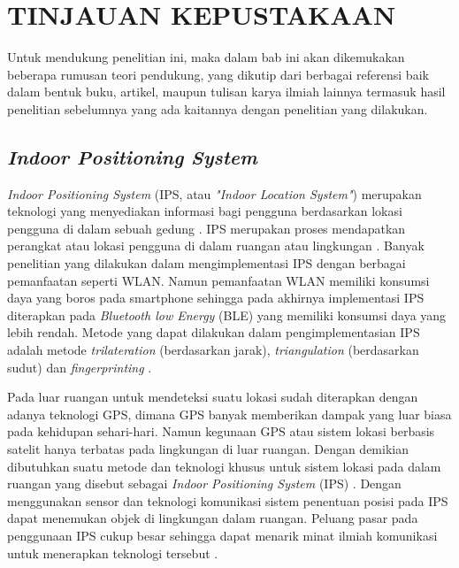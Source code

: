 \fancyhf{} 
\fancyfoot[R]{\thepage}
\chapter{TINJAUAN KEPUSTAKAAN}

\par Untuk mendukung penelitian ini, maka dalam bab ini akan dikemukakan beberapa rumusan teori pendukung, yang dikutip dari berbagai referensi baik dalam bentuk buku, artikel, maupun tulisan karya ilmiah lainnya termasuk hasil penelitian sebelumnya yang ada kaitannya dengan penelitian yang dilakukan.

\section{\textit{Indoor Positioning System}}
\textit{Indoor Positioning System} (IPS, atau \textit{"Indoor Location System"}) merupakan teknologi yang menyediakan informasi bagi pengguna berdasarkan lokasi pengguna di dalam sebuah gedung \citep{brena2017evolution}. IPS merupakan proses mendapatkan perangkat atau lokasi pengguna di dalam ruangan atau lingkungan \citep{zafari2019survey}. Banyak penelitian yang dilakukan dalam mengimplementasi IPS dengan berbagai pemanfaatan seperti WLAN. Namun pemanfaatan WLAN memiliki konsumsi daya yang boros pada smartphone sehingga pada akhirnya implementasi IPS diterapkan pada \textit{Bluetooth low Energy} (BLE) yang memiliki konsumsi daya yang lebih rendah. Metode yang dapat dilakukan dalam pengimplementasian IPS adalah metode \textit{trilateration} (berdasarkan jarak), \textit{triangulation} (berdasarkan sudut) dan \textit{fingerprinting} \citep{puspitasari2020}.

\par Pada luar ruangan untuk mendeteksi suatu lokasi sudah diterapkan dengan adanya teknologi GPS, dimana GPS banyak memberikan dampak yang luar biasa pada kehidupan sehari-hari. Namun kegunaan GPS atau sistem lokasi berbasis satelit hanya terbatas pada lingkungan di luar ruangan. Dengan demikian dibutuhkan suatu metode dan teknologi khusus untuk sistem lokasi pada dalam ruangan yang disebut sebagai \textit{Indoor Positioning System} (IPS) \citep{brena2017evolution}. Dengan menggunakan sensor dan teknologi komunikasi sistem penentuan posisi pada IPS dapat menemukan objek di lingkungan dalam ruangan. Peluang pasar pada penggunaan IPS cukup besar sehingga dapat menarik minat ilmiah komunikasi untuk menerapkan teknologi tersebut \citep{brena2017evolution}.


